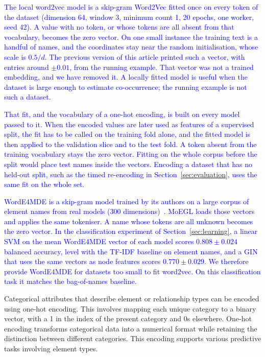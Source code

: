 \documentclass[journal,article,submit,moreauthors,technologies]{Definitions/mdpi}
\newcommand{\rev}[1]{\textcolor{blue}{#1}}
\begin{document}
\rev{The local word2vec model is a skip-gram Word2Vec fitted once on every token of the dataset (dimension 64, window 3, minimum count 1, 20 epochs, one worker, seed 42). A value with no token, or whose tokens are all absent from that vocabulary, becomes the zero vector. On one small instance the training text is a handful of names, and the coordinates stay near the random initialisation, whose scale is \(0.5/d\). The previous version of this article printed such a vector, with entries around \(\pm 0.01\), from the running example. That vector was not a trained embedding, and we have removed it. A locally fitted model is useful when the dataset is large enough to estimate co-occurrence; the running example is not such a dataset.}

\rev{That fit, and the vocabulary of a one-hot encoding, is built on every model passed to it. When the encoded values are later used as features of a supervised split, the fit has to be called on the training fold alone, and the fitted model is then applied to the validation slice and to the test fold. A token absent from the training vocabulary stays the zero vector. Fitting on the whole corpus before the split would place test names inside the vectors. Encoding a dataset that has no held-out split, such as the timed re-encoding in Section~\ref{sec:evaluation}, uses the same fit on the whole set.}

\rev{WordE4MDE is a skip-gram model trained by its authors on a large corpus of element names from real models (300 dimensions)~\cite{lopez2023word}. MoEGL loads those vectors and applies the same tokeniser. A name whose tokens are all unknown becomes the zero vector. In the classification experiment of Section~\ref{sec:learning}, a linear SVM on the mean WordE4MDE vector of each model scores \(0.808\pm0.024\) balanced accuracy, level with the TF-IDF baseline on element names, and a GIN that uses the same vectors as node features scores \(0.770\pm0.029\). We therefore provide WordE4MDE for datasets too small to fit word2vec. On this classification task it matches the bag-of-names baseline.}

Categorical attributes that describe element or relationship types can be encoded using one-hot encoding. This involves mapping each unique category to a binary vector, with a 1 in the index of the present category and 0s elsewhere. One-hot encoding transforms categorical data into a numerical format while retaining the distinction between different categories. This encoding supports various predictive tasks involving element types.
\end{document}
